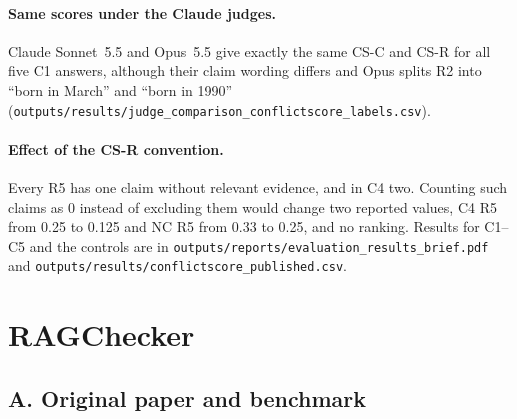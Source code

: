 \documentclass[11pt,a4paper]{article}
\DeclareRobustCommand{\src}[1]{{\small\nolinkurl{#1}}}
\begin{document}
\paragraph{Same scores under the Claude judges.}
Claude Sonnet~5.5 and Opus~5.5 give exactly the same CS-C and CS-R for all five C1 answers, although their claim wording differs and Opus splits R2 into ``born in March'' and ``born in 1990'' (\src{outputs/results/judge_comparison_conflictscore_labels.csv}).

\paragraph{Effect of the CS-R convention.}
Every R5 has one claim without relevant evidence, and in C4 two. Counting such claims as 0 instead of excluding them would change two reported values, C4 R5 from 0.25 to 0.125 and NC R5 from 0.33 to 0.25, and no ranking. Results for C1--C5 and the controls are in \src{outputs/reports/evaluation_results_brief.pdf} and \src{outputs/results/conflictscore_published.csv}.

\section{RAGChecker}
\label{sec:rc}

\subsection{A. Original paper and benchmark}
\end{document}
